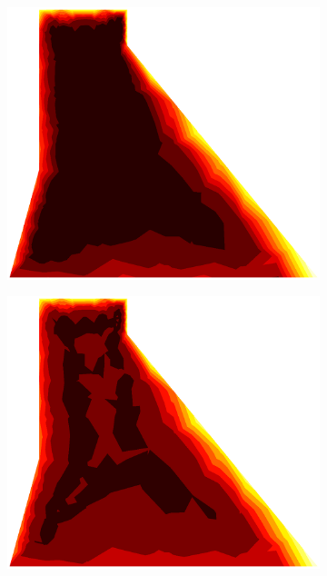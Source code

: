 \documentclass[10pt, a4paper]{article}
\begin{document}
\begin{figure}[H]
\begin{subfigure}[H]{0.19\textwidth}
		\includegraphics[width=1.2\textwidth]{fig/12.eps}
	\end{subfigure}
	\begin{subfigure}[H]{0.19\textwidth}
		\includegraphics[width=1.2\textwidth]{fig/13.eps}
	\end{subfigure}
	\begin{subfigure}[H]{0.19\textwidth}

\end{subfigure}
\end{figure}
\end{document}
